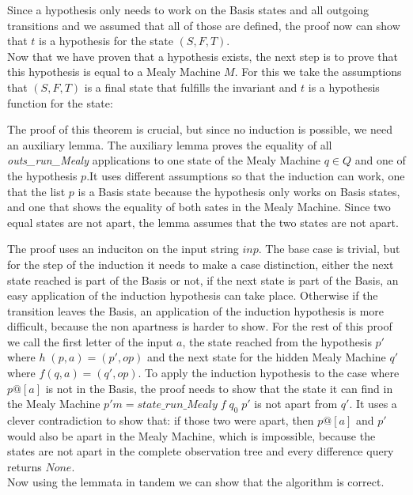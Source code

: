  \begin{myisabelle}
 	\hypofunc
 \end{myisabelle}
Since a hypothesis only needs to work on the Basis states and all outgoing transitions and we assumed that all of those are defined, the proof now can show that $t$ is a hypothesis for the state $(S,F,T)$. \\
Now that we have proven that a hypothesis exists, the next step is to prove that this hypothesis is equal to a Mealy Machine $M$. For this we take the assumptions that $(S,F,T)$ is a final state that fulfills the invariant and $t$ is a hypothesis function for the state: 
\begin{myisabelle}
	\nostepeq
\end{myisabelle}
The proof of this theorem is crucial, but since no induction is possible, we need an auxiliary lemma. The auxiliary lemma proves the equality of all \textit{outs\_run\_Mealy} applications to one state of the Mealy Machine $q\in Q$ and one of the hypothesis $p$.It uses different assumptions so that the induction can work, one that the list $p$ is a Basis state because the hypothesis only works on Basis states, and one that shows the equality of both sates in the Mealy Machine. Since two equal states are not apart, the lemma assumes that the two states are not apart. 
\begin{myisabelle}
	\outsamenostep
\end{myisabelle}
The proof uses an induciton on the input string $inp$. The base case is trivial, but for the step of the induction it needs to make a case distinction, either the next state reached is part of the Basis or not, if the next state is part of the Basis, an easy application of the induction hypothesis can take place. Otherwise if the transition leaves the Basis, an application of the induction hypothesis is more difficult, because the non apartness is harder to show. For the rest of this proof we call the first letter of the input $a$, the state reached from the hypothesis $p'$ where $h\; (p,a) =(p',op)$ and the next state for the hidden Mealy Machine $q'$ where $f (q,a)= (q',op)$. To apply the induction hypothesis to the case where $p@[a]$ is not in the Basis, the proof needs to show that the state it can find in the Mealy Machine $p'm= state\_run\_Mealy\; f\;q_0\;p' $ is not apart from $q'$. It uses a clever contradiction to show that: if those two were apart, then $p@[a]$ and $p'$ would also be apart in the Mealy Machine, which is impossible, because the states are not apart in the complete observation tree and every difference query returns $None$.\\
Now using the lemmata in tandem we can show that the algorithm is correct.
